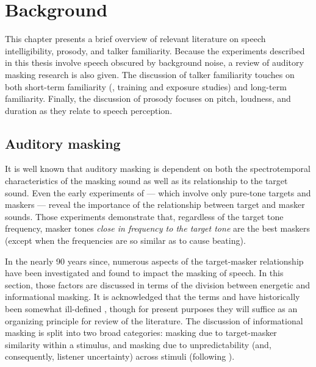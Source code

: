 \chapter{Background\label{chap:Background}}
This chapter presents a brief overview of relevant literature on speech intelligibility, prosody, and talker familiarity.  Because the experiments described in this thesis involve speech obscured by background noise, a review of auditory masking research is also given.  The discussion of talker familiarity touches on both short-term familiarity (\ie, training and exposure studies) and long-term familiarity.  Finally, the discussion of prosody focuses on pitch, loudness, and duration as they relate to speech perception.

\section{Auditory masking}
It is well known that auditory masking is dependent on both the spectrotemporal characteristics of the masking sound as well as its relationship to the target sound.  %
Even the early experiments of \citet{WegelLane1924} — which involve only pure-tone targets and maskers — reveal the importance of the relationship between target and masker sounds.  Those experiments demonstrate that, regardless of the target tone frequency, masker tones \emph{close in frequency to the target tone} are the best maskers (except when the frequencies are so similar as to cause beating).  

In the nearly 90 years since, numerous aspects of the target-masker relationship have been investigated and found to impact the masking of speech.  In this section, those factors are discussed in terms of the division between energetic and informational masking.  It is acknowledged that the terms  and  have historically been somewhat ill-defined \citep[cf. discussions in][]{DurlachEtAl2003a, Watson2005}, though for present purposes they will suffice as an organizing principle for review of the literature.  The discussion of informational masking is split into two broad categories: masking due to target-masker similarity within a stimulus, and masking due to unpredictability (and, consequently, listener uncertainty) across stimuli (following \citealt{KiddEtAl2002} \etseq).  

